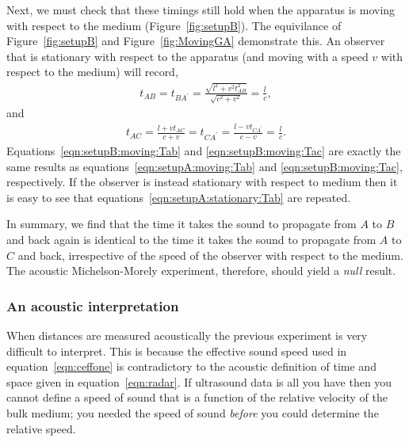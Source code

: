 \documentclass[10pt, fleqn,final,showtrims,oldfontcommands]{article} %
\newcommand{\eqnref}[1]{\ref{eqn:#1}}
\newcommand{\figref}[1]{Figure~\ref{fig:#1}}
\begin{document}
Next, we must check that these timings still hold when the apparatus is moving with respect to the medium (\figref{setupB}).
The equivilance of \figref{setupB} and \figref{MovingGA} demonstrate this.
An observer that is stationary with respect to the apparatus (and moving with a speed $v$ with respect to the medium) will record,
\begin{align}
  \label{eqn:setupB:moving:Tab}
  t_{AB} = t_{BA^\prime} =  \frac{\sqrt{l^2+v^2t_{AB}^2}}{\sqrt{c^2 +v^2}} = \frac{l}{c},
\end{align}
and 
\begin{align}
  \label{eqn:setupB:moving:Tac}
  t_{AC} =  \frac{l+vt_{AC}}{c+v}= t_{CA^\prime} =  \frac{l-vt_{CA^\prime}}{c-v}= \frac{l}{c}.
\end{align}
Equations~\ref{eqn:setupB:moving:Tab} and \ref{eqn:setupB:moving:Tac}  are exactly the same results as equations~\ref{eqn:setupA:moving:Tab} and \ref{eqn:setupB:moving:Tac},
respectively.
If the observer is instead stationary with respect to medium then it is easy to see that equations~\ref{eqn:setupA:stationary:Tab}  are repeated.

In summary, we find that the time it takes the sound to propagate from $A$ to $B$ and back again is
identical to the time it takes the sound to propagate from $A$ to $C$ and back,
irrespective of the speed of the observer with respect to the medium.
The acoustic Michelson-Morely experiment, therefore, should yield a  {\em null} result.
\subsubsection{An acoustic interpretation}\label{sec:MMLorentzian}

When distances are measured acoustically the previous experiment is very difficult to interpret.
This is because the effective sound speed used in equation~\ref{eqn:ceffone}  is contradictory to the acoustic definition of time and space given in equation~\ref{eqn:radar}.
If ultrasound data is all you have then you cannot define a  speed of sound that is a function of the relative velocity of the bulk medium;
you needed the speed of sound {\em before} you could determine the relative speed.


\end{document}
